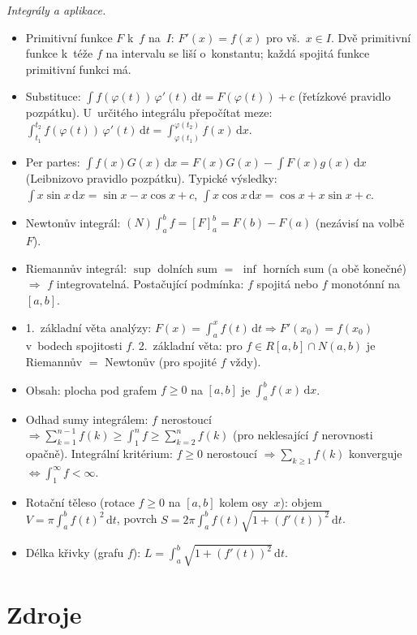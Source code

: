 \documentclass[11pt,a4paper]{article}
\begin{document}
\begin{poznamka}
\smallskip
\emph{Integrály a aplikace.}
\begin{itemize}
  \item Primitivní funkce $F$ k~$f$ na~$I$: $F'(x)=f(x)$ pro vš.\ $x\in I$. Dvě primitivní funkce k~téže $f$ na intervalu se liší o~konstantu; každá spojitá funkce primitivní funkci má.
  \item Substituce: $\int f(\varphi(t))\,\varphi'(t)\,\mathrm{d}t=F(\varphi(t))+c$ (řetízkové pravidlo pozpátku). U~určitého integrálu přepočítat meze: $\int_{t_1}^{t_2}f(\varphi(t))\,\varphi'(t)\,\mathrm{d}t=\int_{\varphi(t_1)}^{\varphi(t_2)}f(x)\,\mathrm{d}x$.
  \item Per partes: $\int f(x)G(x)\,\mathrm{d}x=F(x)G(x)-\int F(x)g(x)\,\mathrm{d}x$ (Leibnizovo pravidlo pozpátku). Typické výsledky: $\int x\sin x\,\mathrm{d}x=\sin x-x\cos x+c$, $\int x\cos x\,\mathrm{d}x=\cos x+x\sin x+c$.
  \item Newtonův integrál: $(N)\!\int_a^b f=[F]_a^b=F(b)-F(a)$ (nezávisí na volbě~$F$).
  \item Riemannův integrál: $\sup$ dolních sum $=$ $\inf$ horních sum (a obě konečné) $\Rightarrow$ $f$ integrovatelná. Postačující podmínka: $f$ spojitá nebo $f$ monotónní na $[a,b]$.
  \item 1.~základní věta analýzy: $F(x)=\int_a^x f(t)\,\mathrm{d}t\Rightarrow F'(x_0)=f(x_0)$ v~bodech spojitosti $f$. 2.~základní věta: pro $f\in R[a,b]\cap N(a,b)$ je Riemannův $=$ Newtonův (pro spojité $f$ vždy).
  \item Obsah: plocha pod grafem $f\ge0$ na $[a,b]$ je $\int_a^b f(x)\,\mathrm{d}x$.
  \item Odhad sumy integrálem: $f$ nerostoucí $\Rightarrow\sum_{k=1}^{n-1}f(k)\ge\int_1^n f\ge\sum_{k=2}^{n}f(k)$ (pro neklesající $f$ nerovnosti opačně). Integrální kritérium: $f\ge0$ nerostoucí $\Rightarrow\sum_{k\ge1}f(k)$ konverguje $\iff\int_1^\infty f<\infty$.
  \item Rotační těleso (rotace $f\ge0$ na $[a,b]$ kolem osy~$x$): objem $V=\pi\int_a^b f(t)^2\,\mathrm{d}t$, povrch $S=2\pi\int_a^b f(t)\sqrt{1+(f'(t))^2}\,\mathrm{d}t$.
  \item Délka křivky (grafu $f$): $L=\int_a^b\sqrt{1+(f'(t))^2}\,\mathrm{d}t$.
\end{itemize}
\end{poznamka}

\section*{Zdroje}
\end{document}
